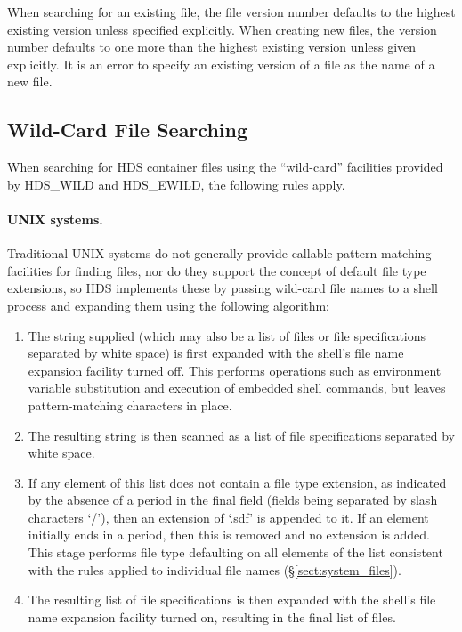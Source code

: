 When searching for an existing file, the file version number defaults to the
highest existing version unless specified explicitly. When creating new files,
the version number defaults to one more than the highest existing version unless
given explicitly. It is an error to specify an existing version of a file as the
name of a new file.

\subsection{Wild-Card File Searching}
\label{sect:system_wild}

When searching for HDS container files using the ``wild-card'' facilities
provided by HDS\_WILD and HDS\_EWILD, the following rules apply.

\paragraph{UNIX systems.} Traditional UNIX systems do not generally provide
callable pattern-matching facilities for finding files, nor do they support the
concept of default file type extensions, so HDS implements these by passing
wild-card file names to a shell process and expanding them using the following
algorithm:

\begin{enumerate}
\item
The string supplied (which may also be a list of files or file specifications
separated by white space) is first expanded with the shell's file name expansion
facility turned off. This performs operations such as environment variable
substitution and execution of embedded shell commands, but leaves
pattern-matching characters in place.

\item
The resulting string is then scanned as a list of file specifications separated
by white space.

\item
If any element of this list does not contain a file type extension, as indicated
by the absence of a period in the final field (fields being separated by slash
characters `/'), then an extension of `.sdf' is appended to it. If an element
initially ends in a period, then this is removed and no extension is added. This
stage performs file type defaulting on all elements of the list consistent with
the rules applied to individual file names (\S\ref{sect:system_files}).

\item
The resulting list of file specifications is then expanded with the shell's file
name expansion facility turned on, resulting in the final list of files.
\end{enumerate}

